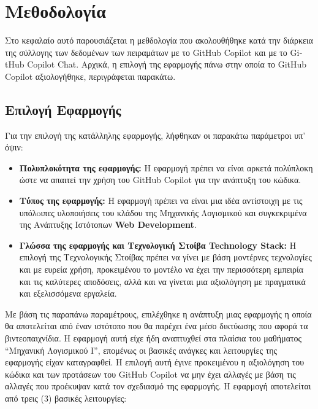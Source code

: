 \chapter{Μεθοδολογία}
\label{ch:chapter3}

Στο κεφαλαίο αυτό παρουσιάζεται η μεθδολογία που ακολουθήθηκε κατά την
διάρκεια της σύλλογης των δεδομένων των πειραμάτων με το
\textlatin{GitHub Copilot} και με το \textlatin{GitHub Copilot Chat}.
Αρχικά, η επιλογή της εφαρμογής πάνω στην οποία το \textlatin{GitHub
  Copilot} αξιολογήθηκε, περιγράφεται παρακάτω.

\section{Επιλογή Εφαρμογής}

\label{sec:app_selection}

Για την επιλογή της κατάλληλης εφαρμογής, λήφθηκαν οι παρακάτω
παράμετροι υπ' όψιν:

\begin{itemize}
\item
  \textbf{Πολυπλοκότητα της εφαρμογής:} Η εφαρμογή πρέπει να είναι
  αρκετά πολύπλοκη ώστε να απαιτεί την χρήση του \textlatin{GitHub
    Copilot} για την ανάπτυξη του κώδικα.
\item
  \textbf{Τύπος της εφαρμογής:} Η εφαρμογή πρέπει να είναι μια ιδέα
  αντίστοιχη με τις υπόλoιπες υλοποιήσεις του κλάδου της Μηχανικής
  Λογισμικού και συγκεκριμένα της Ανάπτυξης Ιστότοπων
  \textlatin{\textbf{Web Development}}.
\item
  \textbf{Γλώσσα της εφαρμογής και Τεχνολογική Στοίβα
    \textlatin{Technology Stack}:} Η επιλογή της Τεχνολογικής Στοίβας
  πρέπει να γίνει με βάση μοντέρνες τεχνολογίες και με ευρεία χρήση,
  προκειμένου το μοντέλο να έχει την περισσότερη εμπειρία και τις
  καλύτερες αποδόσεις, αλλά και να γίνεται μια αξιολόγηση με πραγματικά
  και εξελισσόμενα εργαλεία.
\end{itemize}

Με βάση τις παραπάνω παραμέτρους, επιλέχθηκε η ανάπτυξη μιας εφαρμογής η
οποία θα αποτελείται από έναν ιστότοπο που θα παρέχει ένα μέσο δικτύωσης
που αφορά τα βιντεοπαιχνίδια. Η εφαρμογή αυτή είχε ήδη αναπτυχθεί στα
πλαίσια του μαθήματος ``Μηχανική Λογισμικού Ι'', επομένως οι βασικές
ανάγκες και λειτουργίες της εφαρμογής είχαν καταγραφθεί. Η επιλογή αυτή
έγινε προκειμένου η αξιολόγηση του κώδικα και των προτάσεων του
\textlatin{GitHub Copilot} να μην έχει αλλαγές με βάση τις αλλαγές που
προέκυψαν κατά τον σχεδιασμό της εφαρμογής. Η εφαρμογή αποτελείται από
τρεις (3) βασικές λειτουργίες:

